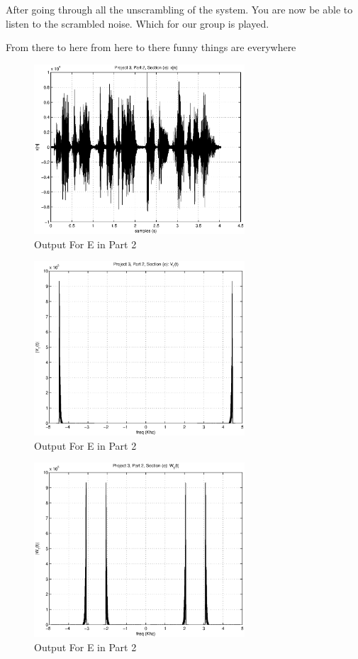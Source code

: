 After going through all the unscrambling of the system. You are now be able to listen to the scrambled noise. Which for our group is played.

From there to here from here to there funny things are everywhere

\begin{figure}[!htbp]
  \centering
    \includegraphics[width=0.7\textwidth]{Part2/Output/Figures/Part2E-1.eps}
  \caption{Output For E in Part 2}
\end{figure}

\begin{figure}[!htbp]
  \centering
    \includegraphics[width=0.7\textwidth]{Part2/Output/Figures/Part2E-2.eps}
  \caption{Output For E in Part 2}
\end{figure}

\begin{figure}[!htbp]
  \centering
    \includegraphics[width=0.7\textwidth]{Part2/Output/Figures/Part2E-3.eps}
  \caption{Output For E in Part 2}
\end{figure}

